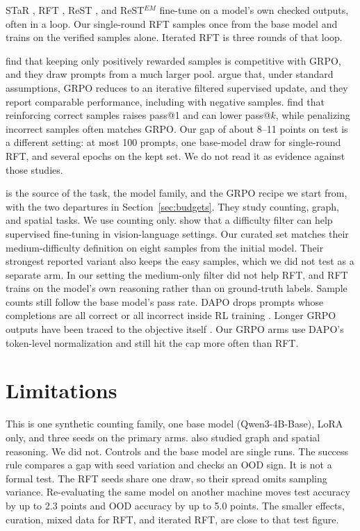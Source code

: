 STaR \citep{zelikman2022star}, RFT \citep{yuan2023scaling}, ReST \citep{gulcehre2023rest}, and ReST$^{EM}$ \citep{singh2024beyond} fine-tune on a model's own checked outputs, often in a loop. Our single-round RFT samples once from the base model and trains on the verified samples alone. Iterated RFT is three rounds of that loop.

\citet{xiong2025minimalist} find that keeping only positively rewarded samples is competitive with GRPO, and they draw prompts from a much larger pool. \citet{samineni2025rl} argue that, under standard assumptions, GRPO reduces to an iterative filtered supervised update, and they report comparable performance, including with negative samples. \citet{zhu2025surprising} find that reinforcing correct samples raises pass@1 and can lower pass@$k$, while penalizing incorrect samples often matches GRPO. Our gap of about 8--11 points on test is a different setting: at most 100 prompts, one base-model draw for single-round RFT, and several epochs on the kept set. We do not read it as evidence against those studies.

\citet{bauer2026} is the source of the task, the model family, and the GRPO recipe we start from, with the two departures in Section~\ref{sec:budgets}. They study counting, graph, and spatial tasks. We use counting only. \citet{lu2026why} show that a difficulty filter can help supervised fine-tuning in vision-language settings. Our curated set matches their medium-difficulty definition on eight samples from the initial model. Their strongest reported variant also keeps the easy samples, which we did not test as a separate arm. In our setting the medium-only filter did not help RFT, and RFT trains on the model's own reasoning rather than on ground-truth labels. Sample counts still follow the base model's pass rate. DAPO drops prompts whose completions are all correct or all incorrect inside RL training \citep{yu2025dapo}. Longer GRPO outputs have been traced to the objective itself \citep{liu2025understanding,samineni2025rl}. Our GRPO arms use DAPO's token-level normalization and still hit the cap more often than RFT.

\section{Limitations}
\label{sec:limitations}

This is one synthetic counting family, one base model (Qwen3-4B-Base), LoRA only, and three seeds on the primary arms. \citet{bauer2026} also studied graph and spatial reasoning. We did not. Controls and the base model are single runs. The success rule compares a gap with seed variation and checks an OOD sign. It is not a formal test. The RFT seeds share one draw, so their spread omits sampling variance. Re-evaluating the same model on another machine moves test accuracy by up to 2.3 points and OOD accuracy by up to 5.0 points. The smaller effects, curation, mixed data for RFT, and iterated RFT, are close to that test figure.

